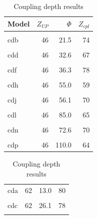 \begin{table}
\caption{\label{tab:zcResults}Coupling depth results}

\centering
\begin{tabular}[t]{lrrr}
\toprule
Model & $Z_{UP}$ & $\Phi$ & \vphantom{3} $Z_{cpl}$\\
\midrule
\cellcolor{gray!6}{cda} & \cellcolor{gray!6}{46} & \cellcolor{gray!6}{13.0} & \cellcolor{gray!6}{66}\\
cdb & 46 & 21.5 & 74\\
\cellcolor{gray!6}{cdc} & \cellcolor{gray!6}{46} & \cellcolor{gray!6}{26.1} & \cellcolor{gray!6}{69}\\
cdd & 46 & 32.6 & 67\\
\cellcolor{gray!6}{cde} & \cellcolor{gray!6}{46} & \cellcolor{gray!6}{22.0} & \cellcolor{gray!6}{72}\\
cdf & 46 & 36.3 & 78\\
\cellcolor{gray!6}{cdg} & \cellcolor{gray!6}{46} & \cellcolor{gray!6}{44.0} & \cellcolor{gray!6}{78}\\
cdh & 46 & 55.0 & 59\\
\cellcolor{gray!6}{cdi} & \cellcolor{gray!6}{46} & \cellcolor{gray!6}{34.0} & \cellcolor{gray!6}{80}\\
cdj & 46 & 56.1 & 70\\
\cellcolor{gray!6}{cdk} & \cellcolor{gray!6}{46} & \cellcolor{gray!6}{68.0} & \cellcolor{gray!6}{58}\\
cdl & 46 & 85.0 & 65\\
\cellcolor{gray!6}{cdm} & \cellcolor{gray!6}{46} & \cellcolor{gray!6}{44.0} & \cellcolor{gray!6}{79}\\
cdn & 46 & 72.6 & 70\\
\cellcolor{gray!6}{cdo} & \cellcolor{gray!6}{46} & \cellcolor{gray!6}{88.0} & \cellcolor{gray!6}{68}\\
cdp & 46 & 110.0 & 64\\
\bottomrule
\end{tabular}
\centering
\begin{tabular}[t]{lrrr}
\toprule
\cellcolor{gray!6}{Model} & \cellcolor{gray!6}{$Z_{UP}$} & \cellcolor{gray!6}{$\Phi$} & \cellcolor{gray!6}{\vphantom{2} $Z_{cpl}$}\\
\midrule
cda & 62 & 13.0 & 80\\
\cellcolor{gray!6}{cdb} & \cellcolor{gray!6}{62} & \cellcolor{gray!6}{21.5} & \cellcolor{gray!6}{79}\\
cdc & 62 & 26.1 & 78\\
\cellcolor{gray!6}{cdd} & \cellcolor{gray!6}{62} & \cellcolor{gray!6}{32.6} & \cellcolor{gray!6}{77}\\

\end{tabular}
\end{table}
